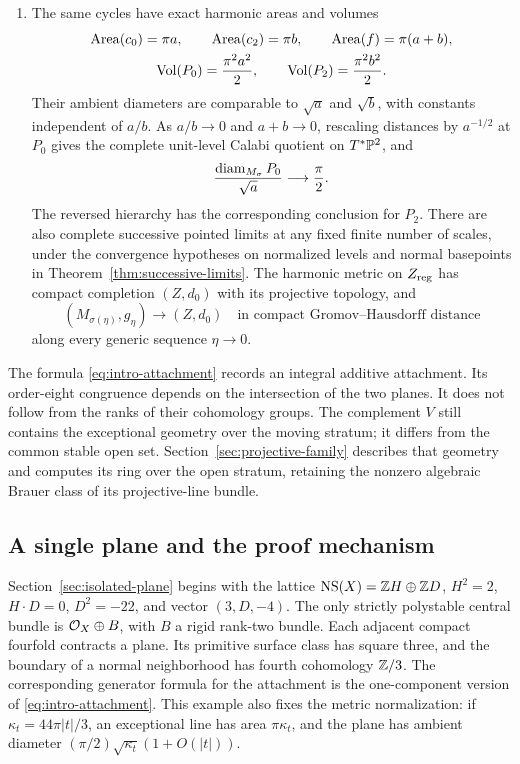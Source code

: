 \begin{theorem}
\begin{enumerate}
\item The same cycles have exact harmonic areas and volumes
\begin{equation}\label{eq:intro-volumes}
 \begin{gathered}
 \operatorname{Area}(c_0)=\pi a,\qquad
 \operatorname{Area}(c_2)=\pi b,\qquad
 \operatorname{Area}(f)=\pi(a+b),\\
 \operatorname{Vol}(P_0)=\frac{\pi^2a^2}{2},\qquad
 \operatorname{Vol}(P_2)=\frac{\pi^2b^2}{2}.
 \end{gathered}
\end{equation}
Their ambient diameters are comparable to $\sqrt a$ and $\sqrt b$,
with constants independent of $a/b$. As $a/b\to0$ and
$a+b\to0$, rescaling distances by $a^{-1/2}$ at $P_0$ gives the
complete unit-level Calabi quotient on $T^*\mathbb P^2$, and
\[
 \frac{\operatorname{diam}_{M_\sigma}P_0}{\sqrt a}\longrightarrow\frac\pi2.
\]
The reversed hierarchy has the corresponding conclusion for $P_2$.
There are also complete successive pointed limits at any fixed finite
number of scales, under the convergence hypotheses on normalized
levels and normal basepoints in Theorem~\ref{thm:successive-limits}.
The harmonic metric on $Z_{\rm reg}$ has compact completion
$(Z,d_0)$ with its projective topology, and
\[
 (M_{\sigma(\eta)},g_\eta)\longrightarrow(Z,d_0)
 \quad\text{in compact Gromov--Hausdorff distance}
\]
along every generic sequence $\eta\to0$.
\end{enumerate}
\end{theorem}

The formula \eqref{eq:intro-attachment} records an integral additive
attachment. Its order-eight congruence depends on the intersection
of the two planes. It does not follow from the ranks of their
cohomology groups. The complement $V$ still contains the exceptional
geometry over the moving stratum; it differs from the common stable
open set. Section~\ref{sec:projective-family} describes that geometry
and computes its ring over the open stratum, retaining the nonzero
algebraic Brauer class of its projective-line bundle.

\subsection{A single plane and the proof mechanism}
Section~\ref{sec:isolated-plane} begins with the lattice
$\operatorname{NS}(X)=\mathbb Z H\oplus\mathbb Z D$, $H^2=2$, $H\cdot D=0$, $D^2=-22$,
and vector $(3,D,-4)$. The only strictly polystable central bundle
is $\mathcal O_X\oplus B$, with $B$ a rigid rank-two bundle. Each adjacent
compact fourfold contracts a plane. Its primitive surface class has
square three, and the boundary of a normal neighborhood has fourth
cohomology $\mathbb Z/3$. The corresponding generator formula for the
attachment is the one-component version of
\eqref{eq:intro-attachment}. This example also fixes the metric
normalization: if $\kappa_t=44\pi|t|/3$, an exceptional line has
area $\pi\kappa_t$, and the plane has ambient diameter
$(\pi/2)\sqrt{\kappa_t}(1+O(|t|))$.

